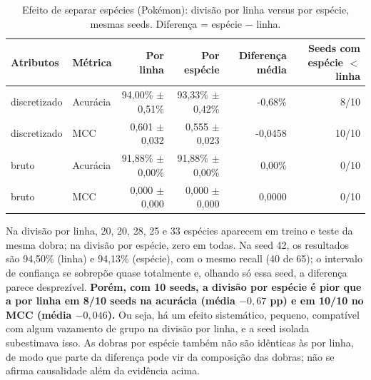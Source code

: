 \documentclass[a4paper,11pt]{article}
\begin{document}
\begin{table}[htbp]
\centering
\small
\caption{Efeito de separar espécies (Pokémon): divisão por linha versus por espécie, mesmas seeds. Diferença = espécie $-$ linha.}
\label{tab:grupo_linha}
\begin{tabular}{llrrrr}
\toprule
Atributos & Métrica & Por linha & Por espécie & Diferença média & Seeds com espécie $<$ linha \\
\midrule
discretizado & Acurácia & 94,00\% $\pm$ 0,51\% & 93,33\% $\pm$ 0,42\% & -0,68\% & 8/10 \\
discretizado & MCC & 0,601 $\pm$ 0,032 & 0,555 $\pm$ 0,023 & -0,0458 & 10/10 \\
bruto & Acurácia & 91,88\% $\pm$ 0,00\% & 91,88\% $\pm$ 0,00\% & 0,00\% & 0/10 \\
bruto & MCC & 0,000 $\pm$ 0,000 & 0,000 $\pm$ 0,000 & 0,0000 & 0/10 \\
\bottomrule
\end{tabular}
\end{table}


Na divis\~ao por linha, 20, 20, 28, 25 e 33 esp\'ecies aparecem em treino e teste da mesma dobra; na divis\~ao por esp\'ecie, zero em todas. Na seed 42, os resultados s\~ao 94,50\% (linha) e 94,13\% (esp\'ecie), com o mesmo recall (40 de 65); o intervalo de confian\c{c}a se sobrep\~oe quase totalmente e, olhando s\'o essa seed, a diferen\c{c}a parece desprez\'ivel. \textbf{Por\'em, com 10 seeds, a divis\~ao por esp\'ecie \'e pior que a por linha em 8/10 seeds na acur\'acia (m\'edia $-0{,}67$ pp) e em 10/10 no MCC (m\'edia $-0{,}046$).} Ou seja, h\'a um efeito sistem\'atico, pequeno, compat\'ivel com algum vazamento de grupo na divis\~ao por linha, e a seed isolada subestimava isso. As dobras por esp\'ecie tamb\'em n\~ao s\~ao id\^enticas \`as por linha, de modo que parte da diferen\c{c}a pode vir da composi\c{c}\~ao das dobras; n\~ao se afirma causalidade al\'em da evid\^encia acima.
\end{document}
